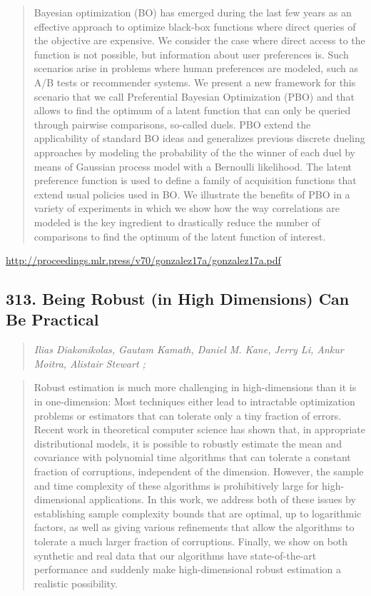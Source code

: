 \documentclass{article}
\begin{document}
\begin{quote}
    Bayesian optimization (BO) has emerged during the last few years as an effective approach to optimize black-box functions where direct queries of the objective are expensive. We consider the case where direct access to the function is not possible, but information about user preferences is. Such scenarios arise in problems where human preferences are modeled, such as A/B tests or recommender systems. We present a new framework for this scenario that we call Preferential Bayesian Optimization (PBO) and that allows to find the optimum of a latent function that can only be queried through pairwise comparisons, so-called duels. PBO extend the applicability of standard BO ideas and generalizes previous discrete dueling approaches by modeling the probability of the the winner of each duel by means of Gaussian process model with a Bernoulli likelihood. The latent preference function is used to define a family of acquisition functions that extend usual policies used in BO. We illustrate the benefits of PBO in a variety of experiments in which we show how the way correlations are modeled is the key ingredient to drastically reduce the number of comparisons to find the optimum of the latent function of interest.  \end{quote}

\href{http://proceedings.mlr.press/v70/gonzalez17a/gonzalez17a.pdf}{http://proceedings.mlr.press/v70/gonzalez17a/gonzalez17a.pdf}

\subsection{313. Being Robust (in High Dimensions) Can Be Practical}

\begin{quote}
\footnotesize{\textit{Ilias Diakonikolas, Gautam Kamath, Daniel M. Kane, Jerry Li, Ankur Moitra, Alistair Stewart ;}}
\end{quote}

\begin{quote}
    Robust estimation is much more challenging in high-dimensions than it is in one-dimension: Most techniques either lead to intractable optimization problems or estimators that can tolerate only a tiny fraction of errors. Recent work in theoretical computer science has shown that, in appropriate distributional models, it is possible to robustly estimate the mean and covariance with polynomial time algorithms that can tolerate a constant fraction of corruptions, independent of the dimension. However, the sample and time complexity of these algorithms is prohibitively large for high-dimensional applications. In this work, we address both of these issues by establishing sample complexity bounds that are optimal, up to logarithmic factors, as well as giving various refinements that allow the algorithms to tolerate a much larger fraction of corruptions. Finally, we show on both synthetic and real data that our algorithms have state-of-the-art performance and suddenly make high-dimensional robust estimation a realistic possibility.  \end{quote}
\end{document}
